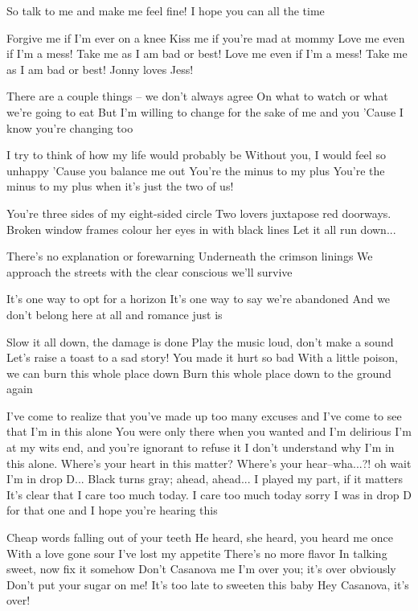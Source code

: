 So talk to me and make me feel fine!
I hope you can all the time

Forgive me if I'm ever on a knee
Kiss me if you're mad at mommy
Love me even if I'm a mess!
Take me as I am bad or best!
Love me even if I'm a mess! Take me as I am bad or best!
Jonny loves Jess!

There are a couple things -- we don't always agree
On what to watch or what we're going to eat
But I'm willing to change for the sake of me and you
'Cause I know you're changing too

I try to think of how my life would probably be
Without you, I would feel so unhappy
'Cause you balance me out
You're the minus to my plus
You're the minus to my plus when it's just the two of us!


You're three sides of my eight-sided circle
Two lovers juxtapose red doorways.
Broken window frames colour her eyes in with black lines
Let it all run down...

There's no explanation or forewarning
Underneath the crimson linings
We approach the streets with the clear conscious we'll survive

It's one way to opt for a horizon
It's one way to say we're abandoned
And we don't belong here at all
and romance just is

Slow it all down, the damage is done
Play the music loud, don't make a sound
Let's raise a toast to a sad story!
You made it hurt so bad
With a little poison, we can burn this whole place down
Burn this whole place down to the ground again


I've come to realize that you've made up too many excuses
and I've come to see that I'm in this alone
You were only there when you wanted and I'm delirious
I'm at my wits end, and you're ignorant to refuse it
I don't understand why I'm in this alone.
Where's your heart in this matter?
Where's your hear--wha...?! oh wait I'm in drop D...
Black turns gray; ahead, ahead...
I played my part, if it matters
It's clear that I care too much today.
I care too much today
sorry I was in drop D for that one
and I hope you're hearing this


Cheap words falling out of your teeth
He heard, she heard, you heard me once
With a love gone sour
I've lost my appetite
There's no more flavor
In talking sweet, now fix it somehow
Don't Casanova me
I'm over you; it's over obviously
Don't put your sugar on me!
It's too late to sweeten this baby
Hey Casanova, it's over!


